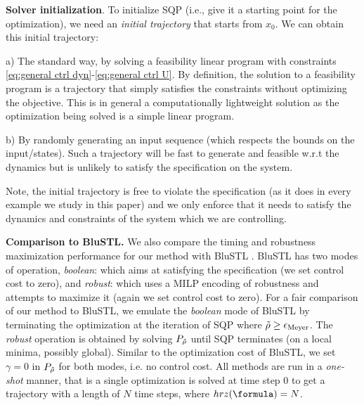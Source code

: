 \textbf{Solver initialization}.
To initialize SQP (i.e., give it a starting point for the optimization), we need an \textit{initial trajectory} that starts from $x_0$. We can obtain this initial trajectory:

 a) The standard way, by solving a feasibility linear program with constraints \eqref{eq:general ctrl dyn}-\eqref{eq:general ctrl U}. By definition, the solution to a feasibility program is a trajectory that simply satisfies the constraints without optimizing the objective. This is in general a computationally lightweight solution as the optimization being solved is a simple linear program.
 
 b) By randomly generating an input sequence (which respects the bounds on the input/states). Such a trajectory will be fast to generate and feasible w.r.t the dynamics but is unlikely to satisfy the specification on the system. 

Note, the initial trajectory is free to violate the specification (as it does in every example we study in this paper) and we only enforce that it needs to satisfy the dynamics and constraints of the system which we are controlling.


\textbf{Comparison to BluSTL.}
We also compare the timing and robustness maximization performance for our method with BluSTL \cite{}. BluSTL has two modes of operation, \textit{boolean}: which aims at satisfying the specification (we set control cost to zero), and \textit{robust}: which uses a MILP encoding of robustness and attempts to maximize it (again we set control cost to zero). For a fair comparison of our method to BluSTL, we emulate the \textit{boolean} mode of BluSTL by terminating the optimization at the iteration of SQP where $\tilde{\rho} \geq \epsilon_{\text{Meyer}}$. The \textit{robust} operation is obtained by solving $P_{\tilde{\rho}}$ until SQP terminates (on a local minima, possibly global). Similar to the optimization cost of BluSTL, we set $\gamma=0$ in $P_{\tilde{\rho}}$ for both modes, i.e. no control cost. All methods are run in a \textit{one-shot} manner, that is a single optimization is solved at time step $0$ to get a trajectory with a length of $N$ time steps, where $hrz(\formula) = N$.


